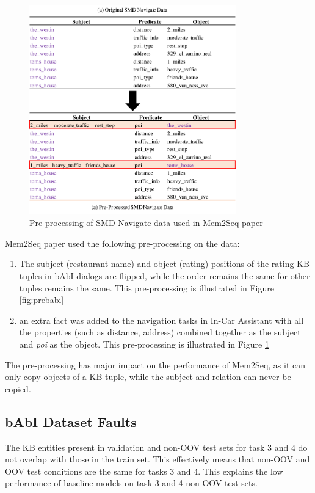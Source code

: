 \begin{figure}[ht]
\centering
\includegraphics[width=0.8\textwidth]{assets/smd-preprocess.pdf}
\caption{Pre-processing of SMD Navigate data used in Mem2Seq paper}
\label{fig:presmd}
\end{figure}

Mem2Seq paper used the following pre-processing on the data:
\begin{enumerate}
    \item The subject (restaurant name) and object (rating) positions of the rating KB tuples in bAbI dialogs are flipped, while the order remains the same for other tuples remains the same. This pre-processing is illustrated in Figure \ref{fig:prebabi}
    \item an extra fact was added to the navigation tasks in In-Car Assistant with all the properties (such as distance, address) combined together  as the subject and \textit{poi} as the object. This pre-processing is illustrated in Figure \ref{fig:presmd}
\end{enumerate}
The pre-processing has major impact on the performance of  Mem2Seq, as it can only copy objects of a KB tuple, while the subject and relation can never be copied.

\subsection{bAbI Dataset Faults}
\label{sec:fault}
The KB entities present in validation and non-OOV test sets for task 3 and 4 do not overlap with those in the train set. This effectively means that non-OOV and OOV test conditions are the same for tasks 3 and 4. This explains the low performance of baseline models on task 3 and 4 non-OOV test sets.

